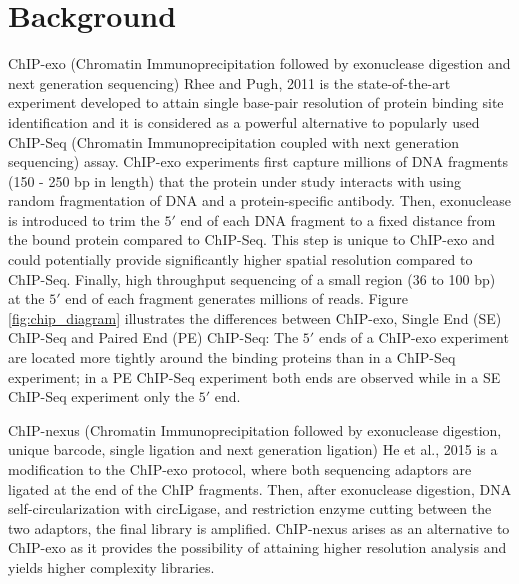 \documentclass{bmcart}\usepackage[]{graphicx}\usepackage[]{color}
\begin{document}
\begin{frontmatter}
\begin{abstractbox}
\begin{keyword}
\end{keyword}

\end{abstractbox}

\end{frontmatter}

\newpage

\section*{Background}
\label{sec:intro}

ChIP-exo (Chromatin Immunoprecipitation followed by exonuclease
digestion and next generation sequencing) Rhee and Pugh, 2011
\nocite{exo1} is the state-of-the-art experiment developed to attain
single base-pair resolution of protein binding site identification and
it is considered as a powerful alternative to popularly used ChIP-Seq
(Chromatin Immunoprecipitation coupled with next generation
sequencing) assay. ChIP-exo experiments first capture millions of DNA
fragments (150 - 250 bp in length) that the protein under study
interacts with using random fragmentation of DNA and a
protein-specific antibody. Then, exonuclease is introduced to trim the
$5\prime$ end of each DNA fragment to a fixed distance from the bound
protein compared to ChIP-Seq. This step is unique to ChIP-exo and
could potentially provide significantly higher spatial resolution
compared to ChIP-Seq. Finally, high throughput sequencing of a small
region (36 to 100 bp) at the $5\prime$ end of each fragment generates
millions of reads. Figure \ref{fig:chip_diagram} illustrates the
differences between ChIP-exo, Single End (SE) ChIP-Seq and Paired End
(PE) ChIP-Seq: The $5\prime$ ends of a ChIP-exo experiment are located
more tightly around the binding proteins than in a ChIP-Seq
experiment; in a PE ChIP-Seq experiment both ends are observed while
in a SE ChIP-Seq experiment only the $5\prime$ end.

ChIP-nexus (Chromatin Immunoprecipitation followed by exonuclease
digestion, unique barcode, single ligation and next generation
ligation) He et al., 2015 \nocite{chipnexus} is a modification to the
ChIP-exo protocol, where both sequencing adaptors are ligated at the
end of the ChIP fragments. Then, after exonuclease digestion, DNA
self-circularization with circLigase, and restriction enzyme cutting
between the two adaptors, the final library is amplified. ChIP-nexus
arises as an alternative to ChIP-exo as it provides the possibility of
attaining higher resolution analysis and yields higher complexity
libraries.
\end{document}
